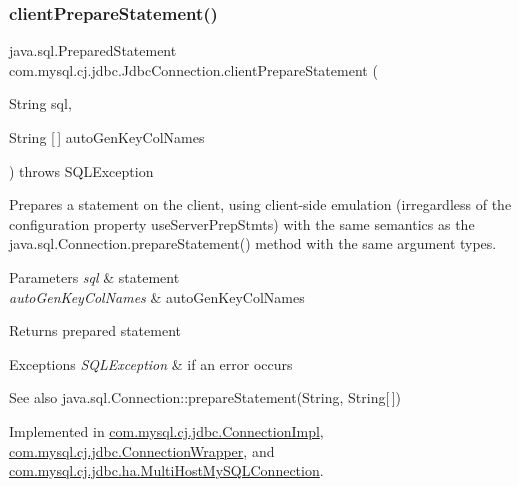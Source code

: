 \subsubsection{\texorpdfstring{client\+Prepare\+Statement()}{clientPrepareStatement()}\hspace{0.1cm}{\footnotesize\ttfamily [6/6]}}
{\footnotesize\ttfamily java.\+sql.\+Prepared\+Statement com.\+mysql.\+cj.\+jdbc.\+Jdbc\+Connection.\+client\+Prepare\+Statement (\begin{DoxyParamCaption}\item[{String}]{sql,  }\item[{String \mbox{[}$\,$\mbox{]}}]{auto\+Gen\+Key\+Col\+Names }\end{DoxyParamCaption}) throws S\+Q\+L\+Exception}

Prepares a statement on the client, using client-\/side emulation (irregardless of the configuration property \textquotesingle{}use\+Server\+Prep\+Stmts\textquotesingle{}) with the same semantics as the java.\+sql.\+Connection.\+prepare\+Statement() method with the same argument types.


\begin{DoxyParams}{Parameters}
{\em sql} & statement \\
\hline
{\em auto\+Gen\+Key\+Col\+Names} & auto\+Gen\+Key\+Col\+Names \\
\hline
\end{DoxyParams}
\begin{DoxyReturn}{Returns}
prepared statement 
\end{DoxyReturn}

\begin{DoxyExceptions}{Exceptions}
{\em S\+Q\+L\+Exception} & if an error occurs\\
\hline
\end{DoxyExceptions}
\begin{DoxySeeAlso}{See also}
java.\+sql.\+Connection\+::prepare\+Statement(\+String, String\mbox{[}$\,$\mbox{]}) 
\end{DoxySeeAlso}


Implemented in \mbox{\hyperlink{classcom_1_1mysql_1_1cj_1_1jdbc_1_1_connection_impl_ade3184b1d304b0ab3a5a0f5d2f8f0539}{com.\+mysql.\+cj.\+jdbc.\+Connection\+Impl}}, \mbox{\hyperlink{classcom_1_1mysql_1_1cj_1_1jdbc_1_1_connection_wrapper_acae69d4edeb44d1ecd2f6750e0312341}{com.\+mysql.\+cj.\+jdbc.\+Connection\+Wrapper}}, and \mbox{\hyperlink{classcom_1_1mysql_1_1cj_1_1jdbc_1_1ha_1_1_multi_host_my_s_q_l_connection_af7a6412387f62b55132775c5f9700fd9}{com.\+mysql.\+cj.\+jdbc.\+ha.\+Multi\+Host\+My\+S\+Q\+L\+Connection}}.

